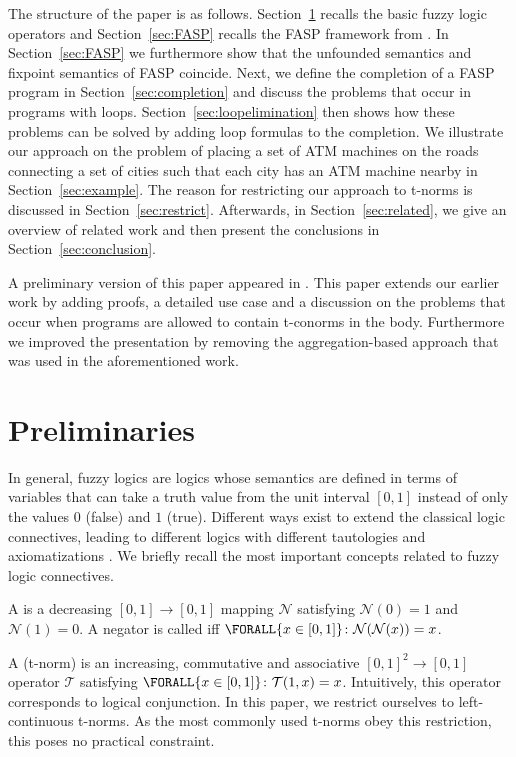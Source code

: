 \documentclass{tlp}
\newcommand{\pretnorm}{\mathcal{T}}
\newcommand{\SUCHTHAT}{\colon}
\newcommand{\Forall}[2]{\ensuremath{\FORALL{#1} \SUCHTHAT {#2}}}
\begin{document}
The structure of the paper is as follows. Section~\ref{sec:prelims} recalls the basic fuzzy logic operators and Section~\ref{sec:FASP}  recalls the FASP framework from \cite{FASP:amai}. In Section~\ref{sec:FASP} we furthermore show that the unfounded semantics and fixpoint semantics of FASP coincide. Next, we define the completion of a FASP program in Section~\ref{sec:completion} and discuss the problems that occur in programs with loops. Section~\ref{sec:loopelimination} then shows how these problems can be solved by adding loop formulas to the completion. We illustrate our approach on the problem of placing a set of ATM machines on the roads connecting a set of cities  such that each city has an ATM machine nearby in Section~\ref{sec:example}. The reason for restricting our approach to t-norms is discussed in Section~\ref{sec:restrict}. Afterwards, in Section~\ref{sec:related}, we give an overview of related work and then present the conclusions in Section~\ref{sec:conclusion}.


A preliminary version of this paper appeared in \cite{FASP-iclp08}. This paper extends our earlier work by adding proofs,
a detailed use case and a discussion on the problems that occur when programs are allowed to contain t-conorms in the body. Furthermore we improved the presentation by removing the aggregation-based approach that was used in the aforementioned work.

\section{Preliminaries}\label{sec:prelims}



In general, fuzzy logics are logics whose semantics are defined in terms of variables that can take a truth value from the unit interval $[0,1]$ instead of only the values $0$ (false) and $1$ (true). Different ways exist to extend the classical logic connectives, leading to different logics with different tautologies and axiomatizations \cite{Hajek98,novak:1999}. We briefly recall the most important concepts related to fuzzy logic connectives.

A  is a decreasing $[0,1] \to [0,1]$ mapping $\mathcal{N}$ satisfying $\mathcal{N}(0) = 1$ and $\mathcal{N}(1) = 0$. A negator is called  iff $\Forall{x \in [0,1]}{\mathcal{N}(\mathcal{N}(x)) = x}$. 

A  (t-norm) is an increasing, commutative and associative $[0,1]^2 \to [0,1]$ operator $\pretnorm$ satisfying $\Forall{x \in [0,1]}{\mathcal{T}(1,x) = x}$. Intuitively, this operator corresponds to logical conjunction. In this paper, we restrict ourselves to left-continuous t-norms. As the most commonly used t-norms obey this restriction, this poses no practical constraint. 
\end{document}
